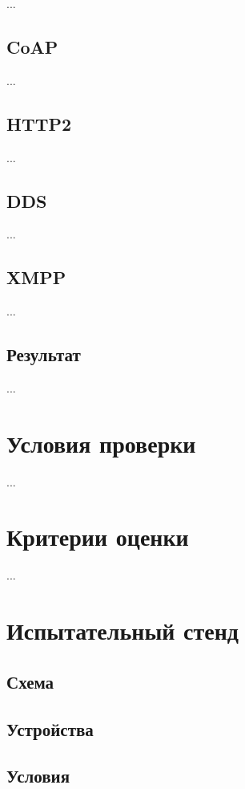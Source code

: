 \documentclass[russian]{article}
\begin{document}
...

\subsection*{CoAP\cite{CoAP}}

...

\subsection*{HTTP2}

...

\subsection*{DDS\cite{DDS}}

...

\subsection*{XMPP\cite{XMPP}}

...

\subsection*{Результат}

...

\section*{Условия проверки}

...


\section*{Критерии оценки}

...

\section*{Испытательный стенд}

\subsection*{Схема}
\subsection*{Устройства}
\subsection*{Условия}
\end{document}
